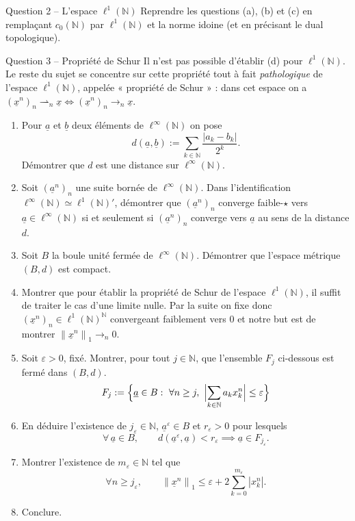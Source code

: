 \documentclass[11pt,a4paper]{article}
\newcommand{\N}{\mathbb{N}}
\newcommand{\norm}[1]{\left\|#1\right\|}
\newcommand{\wk}{\rightharpoonup}
\theoremstyle{definition}
\newcommand{\su}[1]{\underline{#1}}
\newcommand{\linf}{\ell^\infty(\N)}
\newcommand{\lun}{\ell^1(\N)}
\newcommand{\cz}{c_0(\N)}
\begin{document}
\begin{exo}{Question 2 -- L'espace $\ell^1(\N)$}
Reprendre les questions (a), (b) et (c) en remplaçant $\cz$ par $\lun$ et la norme idoine (et en précisant le dual topologique).
\end{exo}

\begin{exo}{Question 3 -- Propriété de Schur}
Il n'est pas possible d'établir (d) pour $\lun$. Le reste du sujet se concentre sur cette propriété tout à fait \emph{pathologique} de l'espace $\lun$, appelée « propriété de Schur » : dans cet espace on a $(\su x^n)_n\wk_n\su x\iff(\su x^n)_n\to_n\su x$.
\begin{enumerate}[label=(\alph*)]
  \item Pour $\su a$ et $\su b$ deux éléments de $\linf$ on pose
  \[
    d(\su a,\su b):=\sum_{k\in\N}\frac{|a_k-b_k|}{2^k}.
  \]
  Démontrer que $d$ est une distance sur $\linf$.
  \item Soit $(\su a^n)_n$ une suite bornée de $\linf$. Dans l'identification $\linf\simeq\lun'$, démontrer que $(\su a^n)_n$ converge faible-$\star$ vers $\su a\in\linf$ si et seulement si $(\su a^n)_n$ converge vers $\su a$ au sens de la distance $d$.
  \item Soit $B$ la boule unité fermée de $\linf$. Démontrer que l'espace métrique $(B,d)$ est compact.
  \item Montrer que pour établir la propriété de Schur de l'espace $\lun$, il suffit de traiter le cas d'une limite nulle. Par la suite on fixe donc $(\su x^n)_n\in\lun^\N$ convergeant faiblement vers $0$ et notre but est de montrer $\norm{\su x^n}_1\to_n0$.
  \item Soit $\varepsilon>0$, fixé. Montrer, pour tout $j\in\N$, que l'ensemble $F_j$ ci-dessous est fermé dans $(B,d)$.
  \[
    F_j:=\Bigl\{\su a\in B:\ \forall n\ge j,\ \Bigl|\sum_{k\in\N}a_kx^n_k\Bigr|\le\varepsilon\Bigr\}
  \]
  \item En déduire l'existence de $j_\varepsilon\in\N$, $\su a^\varepsilon\in B$ et $r_\varepsilon>0$ pour lesquels
  \[
    \forall\,\su a\in B,\qquad d(\su a^\varepsilon,\su a)<r_\varepsilon\implies\su a\in F_{j_\varepsilon}.
  \]
  \item Montrer l'existence de $m_\varepsilon\in\N$ tel que
  \[
    \forall n\ge j_\varepsilon,\qquad\norm{\su x^n}_1\le\varepsilon+2\sum_{k=0}^{m_\varepsilon}|x^n_k|.
  \]
  \item Conclure.
\end{enumerate}
\end{exo}
\end{document}
